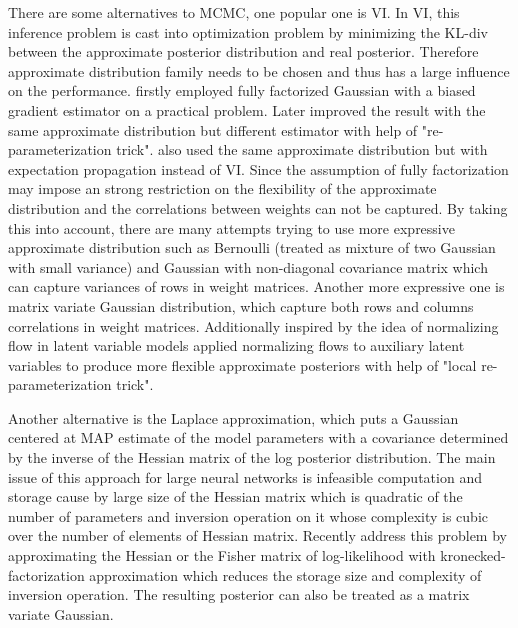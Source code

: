 There are some alternatives to \gls{MCMC}, one popular one is \gls{VI}\cite{hinton1993keeping}. In \gls{VI}, this inference problem is cast into optimization problem by minimizing the \gls{KL-div} between the approximate posterior distribution and real posterior. Therefore approximate distribution family needs to be chosen and thus has a large influence on the performance. \cite{graves2011practical} firstly employed fully factorized Gaussian with a biased gradient estimator on a practical problem. Later \cite{blundell2015weight} improved the result with the same approximate distribution but different estimator with help of "re-parameterization trick"\cite{kingma2013auto}. \citealp{hernandez2015probabilistic} also used the same approximate distribution but with expectation propagation\cite{minka2001expectation} instead of \gls{VI}.
Since the assumption of fully factorization may impose an strong restriction on the flexibility of the approximate distribution and the correlations between weights can not be captured. By taking this into account, there are many attempts trying to use more expressive approximate distribution such as Bernoulli (treated as mixture of two Gaussian with small variance)\cite{gal2016dropout} and Gaussian with non-diagonal covariance matrix \cite{kingma2015variational} which can capture variances of rows in weight matrices. Another more expressive one is matrix variate Gaussian distribution\cite{louizos2016structured}\cite{sun2017learning}\cite{zhang2017noisy}, which capture both rows and columns correlations in weight matrices. Additionally inspired by the idea of normalizing flow in latent variable models \cite{louizos2017multiplicative}applied normalizing flows to auxiliary latent variables to produce more flexible approximate posteriors with help of "local re-parameterization trick"\cite{kingma2015variational}. 


Another alternative is the Laplace approximation\cite{mackay1992practical}, which puts a Gaussian centered at \gls{MAP} estimate of the model parameters with a covariance determined by the inverse of the Hessian matrix of the log posterior distribution. The main issue of this approach for large neural networks is infeasible computation and storage cause by large size of the Hessian matrix which is quadratic of the number of parameters and inversion operation on it whose complexity is cubic over the number of elements of Hessian matrix. Recently \cite{ritter2018scalable} address this problem by approximating the Hessian or the Fisher matrix of log-likelihood with kronecked-factorization approximation which reduces the storage size and complexity of inversion operation. The resulting posterior can also be treated as a matrix variate Gaussian.  


